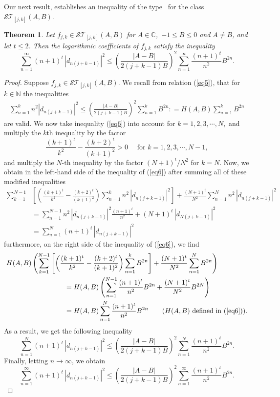 \documentclass[12pt]{amsart}
\numberwithin{equation}{section}
\newtheorem{thm}{Theorem}[section]
\theoremstyle{definition}
\numberwithin{equation}{section}
\newcommand{\bthm}{\begin{thm}}
\newcommand{\ethm}{\end{thm}}
\newcommand{\beq}{\begin{eqnarray}}
\newcommand{\eeq}{\end{eqnarray}}
\newcommand{\bpf}{\begin{proof}}
\newcommand{\epf}{\end{proof}}
\newcommand{\T}{{\mathcal T}}
\newcommand{\es}{{\mathcal S}}
\newcommand{\IC}{{\mathbb C}}
\newcommand{\N}{{\mathbb N}}
\begin{document}
Our next result, establishes an inequality of the type~\cite[Theorem~1.1]{Rot07} for the class $\es \T_{[j,k]}(A,B)$.
\bthm\label{thm3}
Let $f_{j,k} \in \es \T_{[j,k]}(A,B)$ for $A\in\IC $,\,  $-1\le B\le 0$ and $A\neq B$, and let $t\le 2$. Then the logarithmic coefficients of $f_{j,k}$ satisfy the inequality
$$ \sum_{n=1}^{\infty} (n+1)^t \, |d_{n(j+k-1)}|^{2} \leq \left( \frac{|A-B|}{2(j+k-1)B} \right)^2 \sum_{n=1}^{\infty} \frac{(n+1)^t}{n^2} B^{2n}.
$$
\ethm

\bpf
Suppose  $f_{j,k} \in \es \T_{[j,k]}(A,B)$. We recall from relation (\ref{eq5}), that for $k\in\N$ the inequalities
\beq\label{eq6} 
\sum_{n=1}^{k} n^2 |d_{n(j+k-1)}|^2  \le  \left(\frac{|A-B|}{2(j+k-1)B}\right)^2 \sum_{n=1}^{k} B^{2n} : = H(A,B)  \sum_{n=1}^{k} B^{2n}
\eeq
are valid. 
We now take inequality (\ref{eq6}) into account for  $k=1,2,3,\cdots,N,$ and multiply the $k$th inequality by the factor
$$ \frac{(k+1)^t}{k^2} - \frac{(k+2)^t}{(k+1)^2} >0 \quad \mbox{ for } k= 1,2,3,\cdots ,N-1,
$$
and multiply the $N$-th inequality by the factor $(N+1)^t / N^2$ for $k=N$.
Now, we obtain in the left-hand side of the inequality of (\ref{eq6}) after summing all of these modified inequalities
\begin{align*}
 \sum_{k=1}^{N-1} & \left[ \left(\frac{(k+1)^t}{k^2} - \frac{(k+2)^t}{(k+1)^2} \right) \sum_{n=1}^k n^2 \, |d_{n(j+k-1)}|^2  \right]
 + \frac{(N+1)^t}{N^2} \sum_{n=1}^N n^2 \, |d_{n(j+k-1)}|^2  \\
 & =\sum_{n=1}^{N-1} n^2 \, |d_{n(j+k-1)}|^2  \frac{(n+1)^t}{n^2} + (N+1)^t\,|d_{N(j+k-1)}|^2  \\
 & = \sum_{n=1}^{N} (n+1)^t \, |d_{n(j+k-1)}|^2 
\end{align*}
furthermore, on the right side of the inequality of (\ref{eq6}), we find
\begin{align*}
 & H(A,B)\left(\sum_{k=1}^{N-1}  \left[ \left(\frac{(k+1)^t}{k^2} - \frac{(k+2)^t}{(k+1)^2} \right) \sum_{n=1}^k  B^{2n}  \right]
 + \frac{(N+1)^t}{N^2} \sum_{n=1}^N  B^{2n} \right) \\
 & \hspace{3cm} =H(A,B) \left(\sum_{n=1}^{N-1} \frac{(n+1)^t}{n^2} B^{2n} + \frac{(N+1)^t}{N^2} B^{2N} \right)  \\
 & \hspace{3cm} = H(A,B)\sum_{n=1}^{N} \frac{(n+1)^t}{n^2} B^{2n} \quad \quad (H(A,B) \mbox{ defined in } (\ref{eq6})). 
\end{align*}
As a result, we get the following inequality
$$ \sum_{n=1}^{N} (n+1)^t \, |d_{n(j+k-1)}|^2 \le  \left(\frac{|A-B|}{2(j+k-1)B}\right)^2  \sum_{n=1}^{N} \frac{(n+1)^t}{n^2} B^{2n}. 
$$
Finally, letting $n\rightarrow \infty$, we obtain
$$ \sum_{n=1}^{\infty} (n+1)^t \, |d_{n(j+k-1)}|^2 \le  \left(\frac{|A-B|}{2(j+k-1)B}\right)^2  \sum_{n=1}^{\infty} \frac{(n+1)^t}{n^2} B^{2n}. 
$$
\epf
\end{document}
